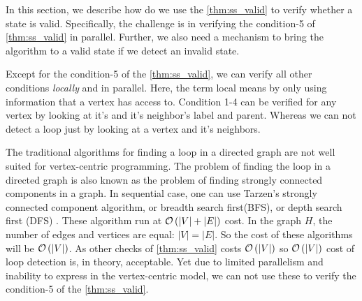 %

In this section, we describe how do we use the  \cref{thm:ss_valid} to verify
whether a state is valid. Specifically, the challenge is in verifying the
condition-5 of \cref{thm:ss_valid} in parallel. Further, we also need a
mechanism to bring the algorithm to a valid state if we detect an invalid
state.


Except for the condition-5 of the \cref{thm:ss_valid}, we can verify all other
conditions \emph{locally} and in parallel.  Here, the term local means by only
using information that a vertex has access to. Condition 1-4 can be verified
for any vertex by looking at it's  and it's neighbor's label and parent.
Whereas we can not detect a loop just by looking at a vertex and it's
neighbors.

The traditional algorithms for finding a loop in a directed graph are not well
suited for vertex-centric programming. The problem of finding the loop in a
directed graph is also known as the problem of finding strongly connected
components in a graph. In sequential case, one can use Tarzen's strongly
connected component algorithm, or breadth search first(BFS), or depth search
first (DFS) .  These algorithm run at $\mathcal{O} \left ( |V| + |E| \right )$ cost.  In the
graph $H$, the number of edges and vertices are equal: $|V|=|E|$. So the cost
of these algorithms will be $\mathcal{O} \left ( |V|  \right )$. As other checks of
\cref{thm:ss_valid} costs $\mathcal{O} \left ( |V|  \right )$ so $\mathcal{O} \left ( |V|  \right )$ cost of loop
detection is, in theory, acceptable.  Yet due to limited parallelism and
inability to express in the vertex-centric model, we can not use these to
verify the condition-5 of the \cref{thm:ss_valid}.
